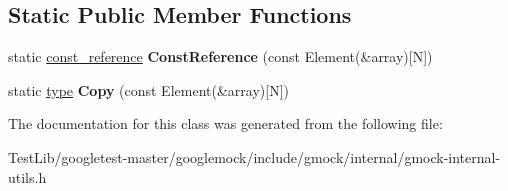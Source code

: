 \subsection*{Static Public Member Functions}
\begin{DoxyCompactItemize}
\item 
\mbox{\label{classtesting_1_1internal_1_1StlContainerView_3_01Element[N]_4_aa1b15d7f43d38751ae19f6dbdcb6aba3}} 
static \hyperlink{classtesting_1_1internal_1_1NativeArray}{const\+\_\+reference} {\bfseries Const\+Reference} (const Element(\&array)\mbox{[}N\mbox{]})
\item 
\mbox{\label{classtesting_1_1internal_1_1StlContainerView_3_01Element[N]_4_af2cf79fbd7f829229a47b52f863c68f8}} 
static \hyperlink{classtesting_1_1internal_1_1NativeArray}{type} {\bfseries Copy} (const Element(\&array)\mbox{[}N\mbox{]})
\end{DoxyCompactItemize}


The documentation for this class was generated from the following file\+:\begin{DoxyCompactItemize}
\item 
Test\+Lib/googletest-\/master/googlemock/include/gmock/internal/gmock-\/internal-\/utils.\+h\end{DoxyCompactItemize}
